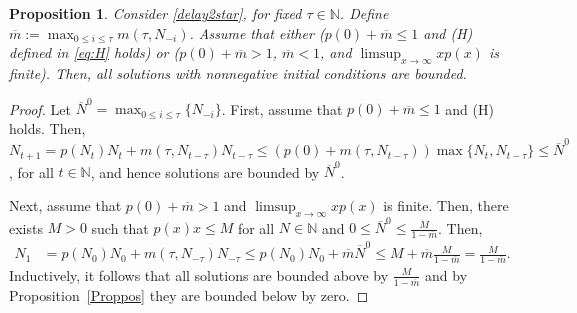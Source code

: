 \documentclass{article}
\numberwithin{theorem}{section}
\newtheorem{proposition}[theorem]{Proposition}
\begin{document}
{
\begin{proposition}\label{Prop:bound}
     Consider \eqref{delay2star}, for fixed $\tau\in \mathbb{N}$. 
    Define $\overline{m}:=\max_{0\leq i\leq \tau}m(\tau,N_{-i})$. 
     Assume  that either ($p(0)+
     \overline{m}\leq 1$  and (H) defined in \eqref{eq:H} holds) or  ($p(0)+\overline{m} > 1$,  $\overline{m}<1$,  and  $\limsup_{x\to\infty} xp(x)$ is finite). 
     Then, all solutions with nonnegative initial  conditions  are bounded. 
 \end{proposition}

 \begin{proof}  
Let  $\overline{N}^0=\max_{0\leq i\leq \tau}\{N_{-i}\}$.
First, assume that  $p(0)+\overline{m}\leq 1$ and (H) holds. Then, $N_{t+1}=p(N_t)N_t+m(\tau, N_{t-\tau})N_{t-\tau}\leq(p(0)+m(\tau, N_{t-\tau}))\max\{N_t,N_{t-\tau}\} \leq \overline{N}^0$,     for all $t\in \mathbb{N}$,  and hence solutions are bounded by $\overline{N}^0$.  

 Next, assume that $p(0)+\overline{m}>1$ and $\limsup_{x\to\infty} xp(x)$ is finite. 
 Then, there exists $M>0$ such that $p(x)x \leq M$ for all $N \in \mathbb{N}$ and 
     $0\leq \overline{N}^0\leq  \frac{M}{1-\overline{m}}$. Then, 
     \begin{align*}
       N_1&= p(N_0)N_0 +m(\tau, N_{-\tau}) N_{-\tau}\leq p(N_0)N_0 +\overline{m}\overline{N}^0 
       \leq M +\overline{m}\frac{M}{1-\overline{m}}=
     \frac{M}{1-\overline{m}}.
 \end{align*}
Inductively, it follows that all solutions are   bounded above by $\frac{M}{1-\overline{m}}$ and by Proposition~\ref{Proppos} they are bounded below by zero.  
 \end{proof} 



}
\end{document}
